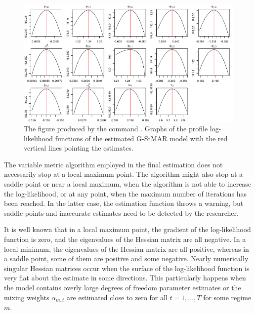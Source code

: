 \documentclass[nojss]{jss} %
\begin{document}
\begin{figure}[p]
  \centering
  \includegraphics{figures/proflogfit42gs.png}
  \caption{The figure produced by the command . Graphs of the profile log-likelihood functions of the estimated G-StMAR model  with the red vertical lines pointing the estimates.}
\label{fig:proflogfit42gs}
\end{figure}

The variable metric algorithm employed in the final estimation does not necessarily stop at a local maximum point. The algorithm might also stop at a saddle point or near a local maximum, when the algorithm is not able to increase the log-likelihood, or at any point, when the maximum number of iterations has been reached. In the latter case, the estimation function throws a warning, but saddle points and inaccurate estimates need to be detected by the researcher.

It is well known that in a local maximum point, the gradient of the log-likelihood function is zero, and the eigenvalues of the Hessian matrix are all negative. In a local minimum, the eigenvalues of the Hessian matrix are all positive, whereas in a saddle point, some of them are positive and some negative. Nearly numerically singular Hessian matrices occur when the surface of the log-likelihood function is very flat about the estimate in some directions. This particularly happens when the model contains overly large degrees of freedom parameter estimates or the mixing weights $\alpha_{m,t}$ are estimated close to zero for all $t=1,...,T$ for some regime $m$.
\end{document}
